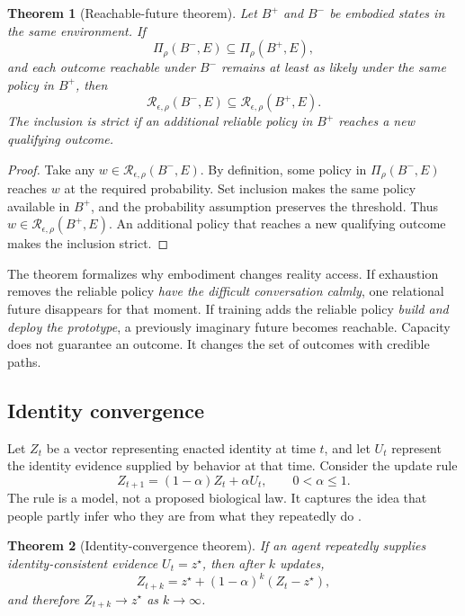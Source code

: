 \documentclass[11pt]{article}
\theoremstyle{plain}
\newtheorem{theorem}{Theorem}[section]
\theoremstyle{definition}
\newcommand{\Aset}{\mathcal{R}}
\newcommand{\Pset}{\Pi}
\begin{document}
\begin{theorem}[Reachable-future theorem]
Let \(B^+\) and \(B^-\) be embodied states in the same environment. If
\[
\Pset_\rho(B^-,E)\subseteq\Pset_\rho(B^+,E),
\]
and each outcome reachable under \(B^-\) remains at least as likely under the same
policy in \(B^+\), then
\[
\Aset_{\epsilon,\rho}(B^-,E)
\subseteq
\Aset_{\epsilon,\rho}(B^+,E).
\]
The inclusion is strict if an additional reliable policy in \(B^+\) reaches a new
qualifying outcome.
\end{theorem}

\begin{proof}
Take any \(w\in\Aset_{\epsilon,\rho}(B^-,E)\). By definition, some policy in
\(\Pset_\rho(B^-,E)\) reaches \(w\) at the required probability. Set inclusion makes
the same policy available in \(B^+\), and the probability assumption preserves the
threshold. Thus \(w\in\Aset_{\epsilon,\rho}(B^+,E)\). An additional policy that reaches
a new qualifying outcome makes the inclusion strict.
\end{proof}

The theorem formalizes why embodiment changes reality access. If exhaustion removes
the reliable policy \emph{have the difficult conversation calmly}, one relational
future disappears for that moment. If training adds the reliable policy \emph{build
and deploy the prototype}, a previously imaginary future becomes reachable. Capacity
does not guarantee an outcome. It changes the set of outcomes with credible paths.

\subsection*{Identity convergence}

Let \(Z_t\) be a vector representing enacted identity at time \(t\), and let \(U_t\)
represent the identity evidence supplied by behavior at that time. Consider the update
rule
\begin{equation}
Z_{t+1}=(1-\alpha)Z_t+\alpha U_t,
\qquad 0<\alpha\leq 1.
\label{eq:identity-update}
\end{equation}
The rule is a model, not a proposed biological law. It captures the idea that people
partly infer who they are from what they repeatedly do
\citep{bem1972selfperception,oyserman2009identity}.

\begin{theorem}[Identity-convergence theorem]
If an agent repeatedly supplies identity-consistent evidence \(U_t=z^\star\), then
after \(k\) updates,
\[
Z_{t+k}=z^\star+(1-\alpha)^k(Z_t-z^\star),
\]
and therefore \(Z_{t+k}\to z^\star\) as \(k\to\infty\).
\end{theorem}
\end{document}
